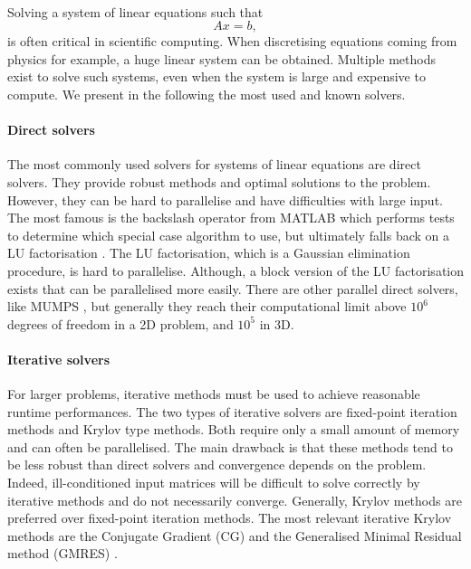\paragraph{}
Solving a system of linear equations such that
\[Ax = b,\]
is often critical in scientific computing.
When discretising equations coming from physics for example, a huge linear system can be obtained.
Multiple methods exist to solve such systems, even when the system is large and expensive to compute.
We present in the following the most used and known solvers.

\paragraph{Direct solvers}
The most commonly used solvers for systems of linear equations are direct solvers.
They provide robust methods and optimal solutions to the problem.
However, they can be hard to parallelise and have difficulties with large input.
The most famous is the backslash operator from MATLAB which performs tests to determine which special case algorithm to use, but ultimately falls back on a LU factorisation \cite{mldivide_matlab}.
The LU factorisation, which is a Gaussian elimination procedure, is hard to parallelise.
Although, a block version of the LU factorisation exists that can be parallelised more easily.
There are other parallel direct solvers, like MUMPS \cite{MUMPS_2001}, but generally they reach their computational limit above \(10^6\) degrees of freedom in a 2D problem, and \(10^5\) in 3D.

\paragraph{Iterative solvers}
For larger problems, iterative methods must be used to achieve reasonable runtime performances.
The two types of iterative solvers are fixed-point iteration methods and Krylov type methods.
Both require only a small amount of memory and can often be parallelised.
The main drawback is that these methods tend to be less robust than direct solvers and convergence depends on the problem.
Indeed, ill-conditioned input matrices will be difficult to solve correctly by iterative methods and do not necessarily converge.
Generally, Krylov methods are preferred over fixed-point iteration methods.
The most relevant iterative Krylov methods are the Conjugate Gradient (CG) and the Generalised Minimal Residual method (GMRES) \cite{saad_iterative_2003} \cite{saad_gmres_1986}.

